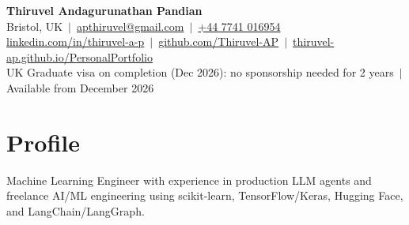 \documentclass[a4paper,10pt]{article}
\begin{document}
\fontsize{10.5}{12.6}\selectfont

\begin{center}
  {\LARGE\bfseries Thiruvel Andagurunathan Pandian}\\[3pt]
  Bristol, UK \,$|$\, \href{mailto:apthiruvel@gmail.com}{apthiruvel@gmail.com} \,$|$\, \href{tel:+447741016954}{+44 7741 016954}\\[1pt]
\href{https://www.linkedin.com/in/thiruvel-a-p/}{linkedin.com/in/thiruvel-a-p} \,$|$\, \href{https://github.com/Thiruvel-AP}{github.com/Thiruvel-AP} \,$|$\, \href{https://thiruvel-ap.github.io/PersonalPortfolio/}{thiruvel-ap.github.io/PersonalPortfolio}\\[1pt]
  UK Graduate visa on completion (Dec 2026): no sponsorship needed for 2 years \,$|$\, Available from December 2026
\end{center}

\section{Profile}
Machine Learning Engineer with experience in production LLM agents and freelance AI/ML engineering using scikit-learn, TensorFlow/Keras, Hugging Face, and LangChain/LangGraph.

\end{document}
